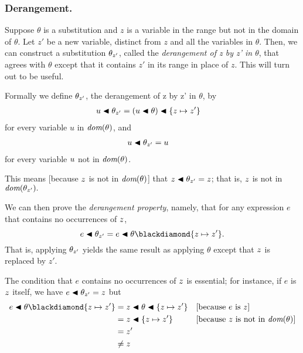 \documentclass[runningheads]{llncs}
\begin{document}
\subsubsection{Derangement.}\label{par:der}  Suppose $\theta$ is a substitution and $z$ is a variable in the range but not in the domain of $\theta$. Let $z'$ be a new variable, distinct from $z$ and all the variables in $\theta$. Then, we can construct a substitution $\theta_{z'}$, called the \emph{derangement of z by z' in $\theta$}, that agrees with $\theta$ except that it contains $z'$ in its range in place of $z$.   This will turn out to be useful.

Formally we define $\theta_{z'}$, the derangement of z by z' in $\theta$, by
\begin{align*}
  & u \blacktriangleleft \theta_{z'} = (u \blacktriangleleft \theta) \blacktriangleleft \{z \mapsto z'\}
 \end{align*}
 for every variable $u$ in $\emph{dom}(\theta)$, and
 \begin{align*}
  & u \blacktriangleleft \theta_{z'} = u  
 \end{align*}
 for every variable $u$ not in $\emph{dom}(\theta)$.

 This means [because $z$ is not in $\emph{dom}(\theta)$] that $z \blacktriangleleft \theta_{z'} = z$; that is, $z$ is not in $\emph{dom}(\theta_{z'}).$ 

 We can then prove the \emph{derangement property}, namely, that 
for any expression $e$ that contains no occurrences of $z$, 
  \[ e \apply \thet{z'} =  e \apply \theta \compose \{\var{z} \mapsto \var{z'}\}.
 \]
 That is,  applying $\theta_{z'}$ yields the same result  as applying $\theta$ except that $z$  is replaced by $z'$.

The condition that $e$ contains no occurrences of $z$ is essential;  for instance, if $e$ is $z$ itself, we have
 $e \blacktriangleleft \theta_{z'} = z$ 
 but 
   \begin{align*}
   e \apply \theta \compose \{\var{z} \mapsto \var{z'}\} 
     & =  \var{z} \apply \theta \apply \{\var{z} \mapsto \var{z'}\}   && \text{[because $e$ is $\var{z}$]} \\
     & =  \var{z} \apply \{\var{z} \mapsto \var{z'}\}   && \text{[because $\var{z}$ is not in $\dom(\theta)$]} \\
     & = \var{z'}                                        \\
     & \neq \var{z}
 \end{align*}
 
\end{document}
